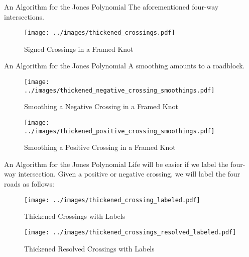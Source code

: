 \documentclass{beamer}
\begin{document}
    \begin{frame}{An Algorithm for the Jones Polynomial}
        The aforementioned four-way intersections.
        \begin{figure}
            \centering
            \texttt{[image: ../images/thickened\_crossings.pdf]}
            \caption{Signed Crossings in a Framed Knot}
            \label{fig:thickened_crossings}
        \end{figure}
    \end{frame}
    \begin{frame}{An Algorithm for the Jones Polynomial}
        A smoothing amounts to a roadblock.
        \begin{figure}
            \centering
            \texttt{[image: ../images/thickened\_negative\_crossing\_smoothings.pdf]}
            \caption{Smoothing a Negative Crossing in a Framed Knot}
            \label{fig:thickened_negative_crossing_smoothings}
        \end{figure}
        \begin{figure}
            \centering
            \texttt{[image: ../images/thickened\_positive\_crossing\_smoothings.pdf]}
            \caption{Smoothing a Positive Crossing in a Framed Knot}
            \label{fig:thickened_positive_crossing_smoothings}
        \end{figure}
    \end{frame}
    \begin{frame}{An Algorithm for the Jones Polynomial}
        Life will be easier if we label the four-way intersection. Given a
        positive or negative crossing, we will label the four roads as follows:
        \begin{figure}
            \centering
            \texttt{[image: ../images/thickened\_crossing\_labeled.pdf]}
            \caption{Thickened Crossings with Labels}
            \label{fig:thickened_crossings_labeled}
        \end{figure}
        \begin{figure}
            \centering
            \texttt{[image: ../images/thickened\_crossings\_resolved\_labeled.pdf]}
            \caption{Thickened Resolved Crossings with Labels}
            \label{fig:thickened_crossings_resolved_labeled}
        \end{figure}
    \end{frame}
\end{document}
